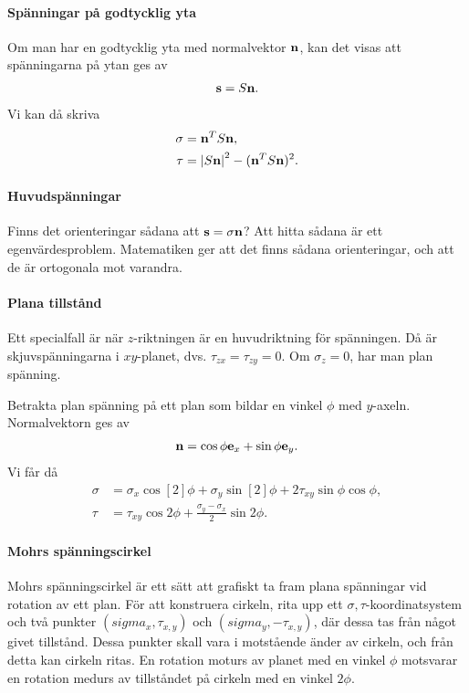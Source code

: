 \paragraph{Spänningar på godtycklig yta}
Om man har en godtycklig yta med normalvektor $\vb{n}$, kan det visas att spänningarna på ytan ges av
\begin{align*}
	\vb{s} = S\vb{n}.
\end{align*}
Vi kan då skriva
\begin{align*}
	\sigma &= \vb{n}^{T}S\vb{n}, \\
	\tau   &= \abs{S\vb{n}}^{2} - (\vb{n}^{T}S\vb{n})^{2}.
\end{align*}

\paragraph{Huvudspänningar}
Finns det orienteringar sådana att $\vb{s} = \sigma\vb{n}$? Att hitta sådana är ett egenvärdesproblem. Matematiken ger att det finns sådana orienteringar, och att de är ortogonala mot varandra.

\paragraph{Plana tillstånd}
Ett specialfall är när $z$-riktningen är en huvudriktning för spänningen. Då är skjuvspänningarna i $xy$-planet, dvs. $\tau_{zx} = \tau_{zy} = 0$. Om $\sigma_{z} = 0$, har man plan spänning.

Betrakta plan spänning på ett plan som bildar en vinkel $\phi$ med $y$-axeln. Normalvektorn ges av
\begin{align*}
	\vb{n} = \cos{\phi}\vb{e}_{x} + \sin{\phi}\vb{e}_{y}.
\end{align*}
Vi får då
\begin{align*}
	\sigma &= \sigma_{x}\cos[2]{\phi} + \sigma_{y}\sin[2]{\phi} + 2\tau_{xy}\sin{\phi}\cos{\phi}, \\
	\tau   &= \tau_{xy}\cos{2\phi} + \frac{\sigma_{y} - \sigma_{x}}{2}\sin{2\phi}.
\end{align*}

\paragraph{Mohrs spänningscirkel}
Mohrs spänningscirkel är ett sätt att grafiskt ta fram plana spänningar vid rotation av ett plan. För att konstruera cirkeln, rita upp ett $\sigma, \tau$-koordinatsystem och två punkter $(sigma_{x}, \tau_{x, y})$ och $(sigma_{y}, -\tau_{x, y})$, där dessa tas från något givet tillstånd. Dessa punkter skall vara i motstående änder av cirkeln, och från detta kan cirkeln ritas. En rotation moturs av planet med en vinkel $\phi$ motsvarar en rotation medurs av tillståndet på cirkeln med en vinkel $2\phi$.

